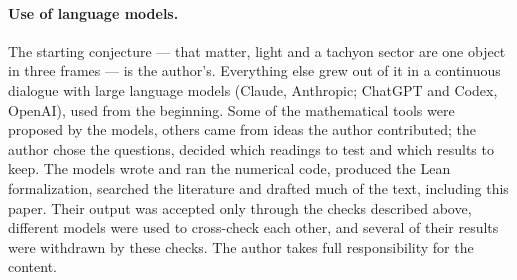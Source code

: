 \paragraph{Use of language models.}  The starting conjecture --- that matter, light and a tachyon sector are one object in three
frames --- is the author's.  Everything else grew out of it in a continuous dialogue with large language models (Claude, Anthropic;
ChatGPT and Codex, OpenAI), used from the beginning.  Some of the mathematical tools were proposed by the models, others came from ideas
the author contributed; the author chose the questions, decided which readings to test and which results to keep.  The models wrote and
ran the numerical code, produced the Lean formalization, searched the literature and drafted much of the text, including this paper.
Their output was accepted only through the checks described above, different models were used to cross-check each other, and several of
their results were withdrawn by these checks.  The author takes full responsibility for the content.
